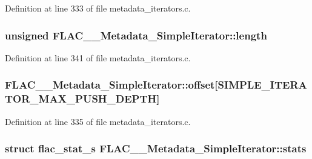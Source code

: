 Definition at line 333 of file metadata\+\_\+iterators.\+c.

\subsubsection[{\texorpdfstring{length}{length}}]{\setlength{\rightskip}{0pt plus 5cm}unsigned F\+L\+A\+C\+\_\+\+\_\+\+Metadata\+\_\+\+Simple\+Iterator\+::length}\hypertarget{struct_f_l_a_c_____metadata___simple_iterator_ad7707b32695d73a1abded2ad9f7b7928}{}\label{struct_f_l_a_c_____metadata___simple_iterator_ad7707b32695d73a1abded2ad9f7b7928}


Definition at line 341 of file metadata\+\_\+iterators.\+c.

\subsubsection[{\texorpdfstring{offset}{offset}}]{ F\+L\+A\+C\+\_\+\+\_\+\+Metadata\+\_\+\+Simple\+Iterator\+::offset\mbox{[}{\bf S\+I\+M\+P\+L\+E\+\_\+\+I\+T\+E\+R\+A\+T\+O\+R\+\_\+\+M\+A\+X\+\_\+\+P\+U\+S\+H\+\_\+\+D\+E\+P\+TH}\mbox{]}}\hypertarget{struct_f_l_a_c_____metadata___simple_iterator_af4b77f4b4c1f90786a038731f8b45a96}{}\label{struct_f_l_a_c_____metadata___simple_iterator_af4b77f4b4c1f90786a038731f8b45a96}


Definition at line 335 of file metadata\+\_\+iterators.\+c.

\subsubsection[{\texorpdfstring{stats}{stats}}]{\setlength{\rightskip}{0pt plus 5cm}struct {\bf flac\+\_\+stat\+\_\+s} F\+L\+A\+C\+\_\+\+\_\+\+Metadata\+\_\+\+Simple\+Iterator\+::stats}\hypertarget{struct_f_l_a_c_____metadata___simple_iterator_a678a2d50a0a11618bde6f1a51b49d9ea}{}\label{struct_f_l_a_c_____metadata___simple_iterator_a678a2d50a0a11618bde6f1a51b49d9ea}


